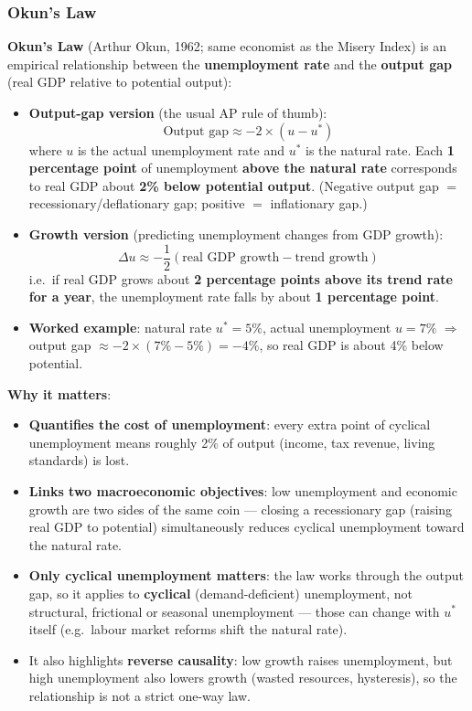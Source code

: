 \documentclass[a4paper,12pt]{article}
\newcommand{\needbold}[1]{\textcolor{red!70!black}{\textbf{#1}}}
\begin{document}
\subsubsection*{Okun's Law}
\needbold{Okun's Law} (Arthur Okun, 1962; same economist as the Misery Index) is an empirical relationship between the \textbf{unemployment rate} and the \textbf{output gap} (real GDP relative to potential output):
\begin{itemize}
  \item \textbf{Output-gap version} (the usual AP rule of thumb):
  \[\text{Output gap} \approx -2 \times (u - u^*)\]
  where $u$ is the actual unemployment rate and $u^*$ is the natural rate. Each \textbf{1 percentage point} of unemployment \textbf{above the natural rate} corresponds to real GDP about \textbf{2\% below potential output}. (Negative output gap $=$ recessionary/deflationary gap; positive $=$ inflationary gap.)
  \item \textbf{Growth version} (predicting unemployment changes from GDP growth):
  \[\Delta u \approx -\dfrac{1}{2}\left(\text{real GDP growth} - \text{trend growth}\right)\]
  i.e.\ if real GDP grows about \textbf{2 percentage points above its trend rate for a year}, the unemployment rate falls by about \textbf{1 percentage point}.
  \item \textbf{Worked example}: natural rate $u^* = 5\%$, actual unemployment $u = 7\%$ $\Rightarrow$ output gap $\approx -2 \times (7\% - 5\%) = -4\%$, so real GDP is about 4\% below potential.
\end{itemize}
\textbf{Why it matters}:
\begin{itemize}
  \item \textbf{Quantifies the cost of unemployment}: every extra point of cyclical unemployment means roughly 2\% of output (income, tax revenue, living standards) is lost.
  \item \textbf{Links two macroeconomic objectives}: low unemployment and economic growth are two sides of the same coin --- closing a recessionary gap (raising real GDP to potential) simultaneously reduces cyclical unemployment toward the natural rate.
  \item \textbf{Only cyclical unemployment matters}: the law works through the output gap, so it applies to \textbf{cyclical} (demand-deficient) unemployment, not structural, frictional or seasonal unemployment --- those can change with $u^*$ itself (e.g.\ labour market reforms shift the natural rate).
  \item It also highlights \textbf{reverse causality}: low growth raises unemployment, but high unemployment also lowers growth (wasted resources, hysteresis), so the relationship is not a strict one-way law.
\end{itemize}
\end{document}
